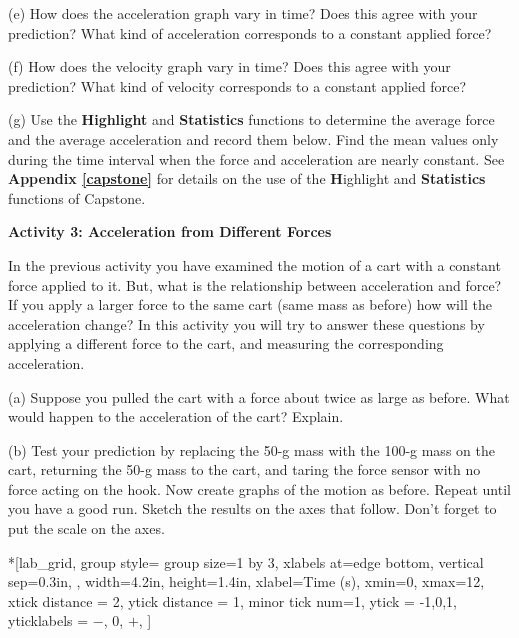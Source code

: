 \pagebreak[2]
(e) How does the acceleration graph vary in time? Does this agree with your
prediction? What kind of acceleration corresponds to a constant applied force?
\answerspace{20mm}

(f) How does the velocity graph vary in time? Does this agree with your prediction?
What kind of velocity corresponds to a constant applied force?
\answerspace{20mm}

(g) Use the \textbf{Highlight} and \textbf{Statistics} functions to determine 
the average force and the average acceleration
and record them below. Find the mean values only during the time interval when
the force and acceleration are nearly constant. See \textbf{Appendix \ref{capstone}} for details on
the use of the \textbf Highlight and  \textbf{Statistics} functions of Capstone.
\answerspace{20mm}

\textbf{Activity 3: Acceleration from Different Forces }

In the previous activity you have examined the motion of a cart with a constant
force applied to it. But, what is the relationship between acceleration and
force? If you apply a larger force to the same cart (same mass as before) how
will the acceleration change? In this activity you will try to answer these
questions by applying a different force to the cart, and measuring the corresponding
acceleration. 

(a) Suppose you pulled the cart with a force about twice as large as before.
What would happen to the acceleration of the cart? Explain.
\answerspace{20mm}

\pagebreak[3]
(b) Test your prediction by replacing the 50-g mass with the 100-g mass on the cart, 
returning the 50-g mass to the cart, and taring the force sensor with no force acting on the hook.
Now create graphs of the motion as before. 
Repeat until you have a good run. Sketch the
results on the axes that follow. Don't forget to put the scale on the axes.

\begin{lab_groupplot}*{}[lab_grid,
	group style={
		group size=1 by 3,
		xlabels at=edge bottom,
		vertical sep=0.3in,
		},
	width=4.2in,  height=1.4in,
	xlabel=Time (s),
	xmin=0, xmax=12,
	xtick distance = 2, 
	ytick distance = 1, 
	minor tick num=1,
	ytick = {-1,0,1},
	yticklabels = {$-$, 0, $+$},
	]
\nextgroupplot[
	ymin=-1,ymax=1, 
	ylabel={Velocity (m/s)},
	]
\nextgroupplot[
	ymin=-1,ymax=1, 
	ylabel={Acceleration (m/s$^2$)},
	]
\nextgroupplot[
	ymin=-1,ymax=1, 
	ylabel={Force (N)},
	]
\end{lab_groupplot}


